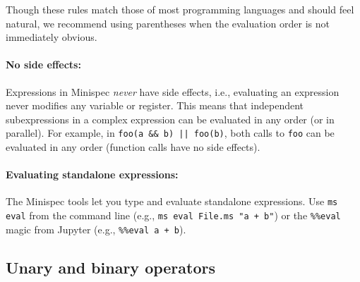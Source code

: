 Though these rules match those of most programming languages and should feel natural,
we recommend using parentheses when the evaluation order is not immediately obvious.

\paragraph{No side effects:} Expressions in Minispec \emph{never} have side effects,
i.e., evaluating an expression never modifies any variable or register.
This means that independent subexpressions in a complex expression can be evaluated in any order (or in parallel).
For example, in \texttt{foo(a \&\& b) || foo(b)}, both calls to \texttt{foo}
can be evaluated in any order (function calls have no side effects).

\paragraph{Evaluating standalone expressions:} The Minispec tools let you type and evaluate standalone expressions.
Use \texttt{ms eval} from the command line (e.g., \verb|ms eval File.ms "a + b"|)
or the \texttt{\%\%eval} magic from Jupyter (e.g., \texttt{\%\%eval a + b}).


\subsection{Unary and binary operators}

